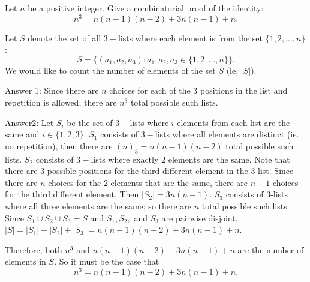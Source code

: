 \documentclass{article}
\theoremstyle{definition}
\begin{document}
\begin{question}
    Let $n$ be a positive integer.  Give a combinatorial proof of the identity:
    \[ n^3 = n(n-1)(n-2) + 3n(n-1) + n. \]
\end{question}
\begin{solution}
    Let $S$ denote the set of all $3-$lists where each element is from the set $\{1, 2, \dots, n\}$:
    \[S=\{(a_1, a_2, a_3): a_1, a_2, a_3\in \{1, 2, \dots, n\}\}.\]
    We would like to count the number of elements of the set $S$ (ie, $|S|$).
    
    Answer 1: Since there are $n$ choices for each of the 3 positions in the list and repetition is allowed, there are $n^3$ total possible such lists.
    
    Answer2: Let $S_i$ be the set of $3-$lists where $i$ elements from each list are the same and $i\in\{1, 2, 3\}$. $S_1$ consists of $3-$lists where all elements are distinct (ie. no repetition), then there are $(n)_3=n(n-1)(n-2)$ total possible such lists. $S_2$ consists of $3-$lists where exactly 2 elements are the same. Note that there are 3 possible positions for the third different element in the 3-list. Since there are $n$ choices for the 2 elements that are the same, there are $n-1$ choices for the third different element. Then $|S_2|=3n(n-1)$. $S_3$ consists of $3$-lists where all three elements are the same; so there are $n$ total possible such lists. Since $S_1\cup S_2\cup S_3=S$ and $S_1, S_2,$ and $S_3$ are pairwise disjoint, $|S| = |S_1|+|S_2|+|S_3|= n(n-1)(n-2)+3n(n-1)+n$.
    
    Therefore, both $n^3$ and $n(n-1)(n-2)+3n(n-1)+n$ are the number of elements in $S$. So it must be the case that
    \[n^3 = n(n-1)(n-2) + 3n(n-1) + n. \]
\end{solution}
\end{document}
